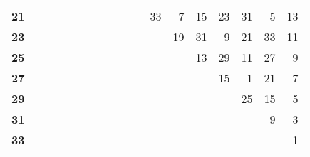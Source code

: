 \begin{tabular}{rllllllllrrrrrrrrr}
\textbf{21} &  &  &  &  &  &  &  &  & \multicolumn{1}{l}{} & \multicolumn{1}{l}{} & 33 & 7 & 15 & 23 & 31 & 5 & 13 \\ 
\textbf{23} &  &  &  &  &  &  &  &  & \multicolumn{1}{l}{} & \multicolumn{1}{l}{} & \multicolumn{1}{l}{} & 19 & 31 & 9 & 21 & 33 & 11 \\ 
\textbf{25} &  &  &  &  &  &  &  &  & \multicolumn{1}{l}{} & \multicolumn{1}{l}{} & \multicolumn{1}{l}{} & \multicolumn{1}{l}{} & 13 & 29 & 11 & 27 & 9 \\ 
\textbf{27} &  &  &  &  &  &  &  &  & \multicolumn{1}{l}{} & \multicolumn{1}{l}{} & \multicolumn{1}{l}{} & \multicolumn{1}{l}{} & \multicolumn{1}{l}{} & 15 & 1 & 21 & 7 \\ 
\textbf{29} &  &  &  &  &  &  &  &  & \multicolumn{1}{l}{} & \multicolumn{1}{l}{} & \multicolumn{1}{l}{} & \multicolumn{1}{l}{} & \multicolumn{1}{l}{} & \multicolumn{1}{l}{} & 25 & 15 & 5 \\ 
\textbf{31} &  &  &  &  &  &  &  &  & \multicolumn{1}{l}{} & \multicolumn{1}{l}{} & \multicolumn{1}{l}{} & \multicolumn{1}{l}{} & \multicolumn{1}{l}{} & \multicolumn{1}{l}{} & \multicolumn{1}{l}{} & 9 & 3 \\ 
\textbf{33} &  &  &  &  &  &  &  &  & \multicolumn{1}{l}{} & \multicolumn{1}{l}{} & \multicolumn{1}{l}{} & \multicolumn{1}{l}{} & \multicolumn{1}{l}{} & \multicolumn{1}{l}{} & \multicolumn{1}{l}{} & \multicolumn{1}{l}{} & 1 \\ 
\end{tabular}
